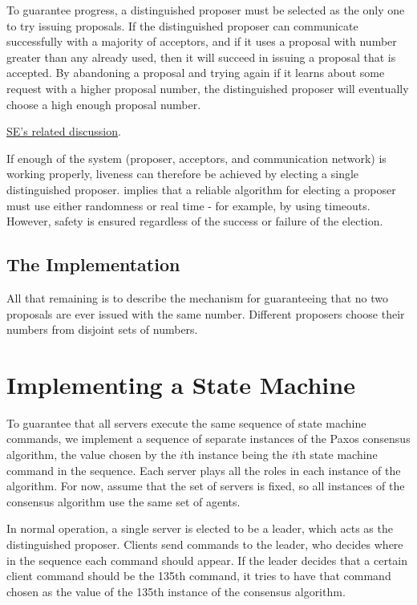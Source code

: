 \documentclass[11pt]{article}
\begin{document}
To guarantee progress, a distinguished proposer must be selected as the only one to try issuing
proposals. If the distinguished proposer can communicate successfully with a majority of acceptors,
and if it uses a proposal with number greater than any already used, then it will succeed in issuing a
proposal that is accepted. By abandoning a proposal and trying again if it learns about some request
with a higher proposal number, the distinguished proposer will eventually choose a high enough
proposal number.

\href{https://stackoverflow.com/questions/42252780/paxos-leader-election-might-not-terminate}{SE's related discussion}.

If enough of the system (proposer, acceptors, and communication network) is working properly, liveness
can therefore be achieved by electing a single distinguished proposer. \cite{10.1145/3149.214121}
implies that a reliable algorithm for electing a proposer must use either randomness or real time -
for example, by using timeouts. However, safety is ensured regardless of the success or failure of the election.
\subsection{The Implementation}
\label{sec:org3a1c4ee}
All that remaining is to describe the mechanism for guaranteeing that no two proposals are ever issued
with the same number. Different proposers choose their numbers from disjoint sets of numbers.
\section{Implementing a State Machine}
\label{sec:orgd66249f}
To guarantee that all servers execute the same sequence of state machine commands, we implement a
sequence of separate instances of the Paxos consensus algorithm, the value chosen by the \(i\)th
instance being the \(i\)th state machine command in the sequence. Each server plays all the roles in
each instance of the algorithm. For now, assume that the set of servers is fixed, so all instances of
the consensus algorithm use the same set of agents.

In normal operation, a single server is elected to be a leader, which acts as the distinguished
proposer. Clients send commands to the leader, who decides where in the sequence each command should
appear. If the leader decides that a certain client command should be the 135th command, it tries to
have that command chosen as the value of the 135th instance of the consensus algorithm.
\end{document}
